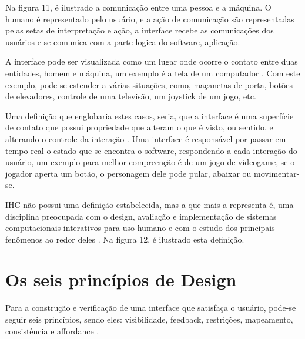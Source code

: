 \documentclass[12pt,oneside,a4paper,chapter=TITLE,section=TITLE,sumario=tradicional]{abntex2}
\begin{document}
Na figura 11, é ilustrado a comunicação entre uma pessoa e a máquina. O humano é representado pelo usuário, e a ação de comunicação são representadas pelas setas de interpretação e ação, a interface recebe as comunicações dos usuários e se comunica com a parte logica do software, aplicação.

\begin{figure}[htb]
\end{figure}

A interface pode ser visualizada como um lugar onde ocorre o contato entre duas entidades, homem e máquina, um exemplo é a tela de um computador \cite{rocha2003}. Com este exemplo, pode-se estender a várias situações, como, maçanetas de porta, botões de elevadores, controle de uma televisão, um joystick de um jogo, etc.

Uma definição que englobaria estes casos, seria, que a interface é uma superfície de contato que possui propriedade que alteram o que é visto, ou sentido, e alterando o controle da interação \cite{laurel1993}. Uma interface é responsável por passar em tempo real o estado que se encontra o software, respondendo a cada interação do usuário, um exemplo para melhor compreenção é de um jogo de videogame, se o jogador aperta um botão, o personagem dele pode pular, abaixar ou movimentar-se.

IHC não possui uma definição estabelecida, mas a que mais a representa é, uma disciplina preocupada com o design, avaliação e implementação de sistemas computacionais interativos para uso humano e com o estudo dos principais fenômenos ao redor deles \cite{rocha2003}. Na figura 12, é ilustrado esta definição.

\begin{figure}[htb]
\end{figure}

\section{Os seis princípios de Design}
\label{sec:seisprincipios}

Para a construção e verificação de uma interface que satisfaça o usuário, pode-se seguir seis princípios, sendo eles: visibilidade, feedback, restrições, mapeamento, consistência e affordance \cite{norman2002}.
\end{document}
